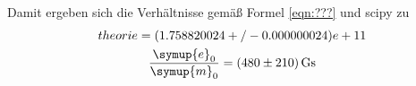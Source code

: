 Damit ergeben sich die Verhältnisse gemäß Formel \eqref{eqn:???} und scipy \cite{scipy} zu
\begin{gather*}
	theorie =  (1.758820024+/-0.000000024)e+11 \\
	\frac{\symup{e}_0}{\symup{m}_0} = \SI{480(210)}{\giga\second}
\end{gather*}
